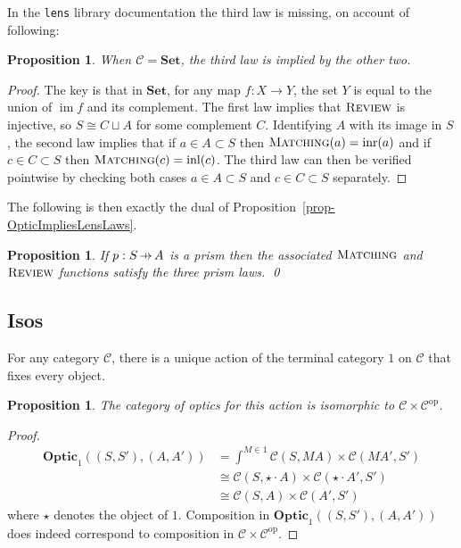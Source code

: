 \documentclass[11pt,a4paper]{article}
\theoremstyle{plain}
\newtheorem{proposition}[theorem]{Proposition}
\theoremstyle{definition}
\newcommand{\C}{\mathscr{C}}
\newcommand{\lenslib}{\texttt{lens}}
\newcommand{\Set}{\mathbf{Set}}
\newcommand{\Optic}{\mathbf{Optic}}
\newcommand{\op}{\mathrm{op}}
\newcommand{\inl}{\mathrm{inl}}
\newcommand{\inr}{\mathrm{inr}}
\DeclareMathOperator{\im}{im}
\newcommand{\freview}{\textsc{Review}}
\newcommand{\fmatching}{\textsc{Matching}}
\newcommand{\hto}{\ensuremath{\,\mathaccent\shortmid\rightarrow\,}}
\begin{document}
In the \lenslib{} library documentation the third law is missing, on account of following:

\begin{proposition}
  When $\C = \Set$, the third law is implied by the other two.
\end{proposition}
\begin{proof}
  The key is that in $\Set$, for any map $f : X \to Y$, the set $Y$ is equal to the union of $\im f$ and its complement. The first law implies that $\freview$ is injective, so $S \cong C \sqcup A$ for some complement $C$. Identifying $A$ with its image in $S$, the second law implies that if $a\in A \subset S$ then $\fmatching(a) = \inr(a)$ and if $c\in C \subset S$ then $\fmatching(c) = \inl(c)$. The third law can then be verified pointwise by checking both cases $a\in A \subset S$ and $c\in C \subset S$ separately.
\end{proof}

The following is then exactly the dual of Proposition~\ref{prop-OpticImpliesLensLaws}.
\begin{proposition}\label{prop-OpticImpliesPrismLaws}
  If $p : S \hto A$ is a prism then the associated $\fmatching$ and $\freview$ functions satisfy the three prism laws. \qed
\end{proposition}

\subsection{Isos}

For any category $\C$, there is a unique action of the terminal category $1$ on $\C$ that fixes every object.

\begin{proposition}
  The category of optics for this action is isomorphic to $\C \times \C^\op$.
\end{proposition}
\begin{proof}
  \begin{align*}
    \Optic_1((S, S'), (A, A')) &= \int^{M \in 1} \C(S, MA) \times \C(MA', S') \\
                               &\cong \C(S, \star \cdot A) \times \C(\star \cdot A', S') \\
                               &\cong \C(S, A) \times \C(A', S')
  \end{align*}
  where $\star$ denotes the object of $1$. Composition in $\Optic_1((S, S'), (A, A'))$ does indeed correspond to composition in $\C \times \C^\op$.
\end{proof}
\end{document}
